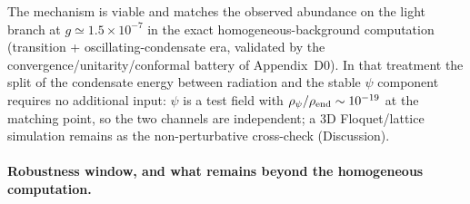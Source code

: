 \documentclass[pdflatex,sn-mathphys-num]{sn-jnl}
\theoremstyle{thmstyleone}
\begin{document}
The mechanism is viable and matches the observed abundance on the light branch at $g\simeq1.5\times10^{-7}$ in the exact homogeneous-background computation (transition + oscillating-condensate era, validated by the convergence/unitarity/conformal battery of Appendix~D0). In that treatment the split of the condensate energy between radiation and the stable $\psi$ component requires no additional input: $\psi$ is a test field with $\rho_\psi/\rho_{\rm end}\sim10^{-19}$ at the matching point, so the two channels are independent; a 3D Floquet/lattice simulation remains as the non-perturbative cross-check (Discussion).

\paragraph{Robustness window, and what remains beyond the homogeneous computation.}
\end{document}
